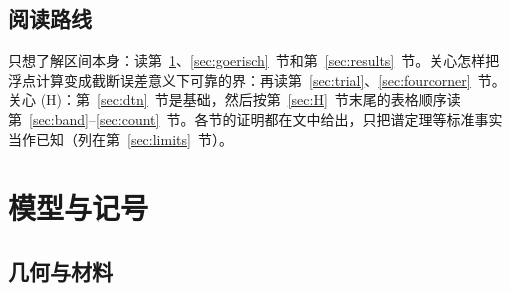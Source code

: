 \documentclass[11pt,a4paper,fontset=fandol]{ctexart}
\begin{document}
\subsection{阅读路线}

只想了解区间本身：读第~\ref{sec:model}、\ref{sec:goerisch}~节和第~\ref{sec:results}~节。关心怎样把浮点计算变成截断误差意义下可靠的界：再读第~\ref{sec:trial}、\ref{sec:fourcorner}~节。关心 (H)：第~\ref{sec:dtn}~节是基础，然后按第~\ref{sec:H}~节末尾的表格顺序读第~\ref{sec:band}--\ref{sec:count}~节。各节的证明都在文中给出，只把谱定理等标准事实当作已知（列在第~\ref{sec:limits}~节）。

\section{模型与记号}
\label{sec:model}
\subsection{几何与材料}
\end{document}
